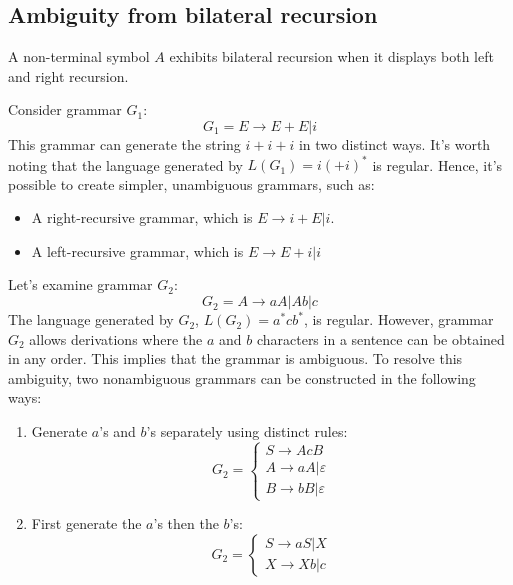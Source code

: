 \subsection*{Ambiguity from bilateral recursion}
A non-terminal symbol $A$ exhibits bilateral recursion when it displays both left and right recursion.
\begin{example}
    Consider grammar $G_1$:
    \[G_1= E \rightarrow E+E|i\]
    This grammar can generate the string $i+i+i$ in two distinct ways.
    It's worth noting that the language generated by $L(G_1)=i(+i)^{*}$ is regular.
    Hence, it's possible to create simpler, unambiguous grammars, such as:
    \begin{itemize}
        \item A right-recursive grammar, which is $E \rightarrow i+E|i$.
        \item A left-recursive grammar, which is $E \rightarrow E+i|i$
    \end{itemize}
\end{example}
\begin{example}
    Let's examine grammar $G_2$:
    \[G_2= A \rightarrow aA|Ab|c\]
    The language generated by $G_2$, $L(G_2) = a^{*}cb^{*}$, is regular. 
    However, grammar $G_2$ allows derivations where the $a$ and $b$ characters in a sentence can be obtained in any order.
    This implies that the grammar is ambiguous.
    To resolve this ambiguity, two nonambiguous grammars can be constructed in the following ways:
    \begin{enumerate}
        \item Generate $a$'s and $b$'s separately using distinct rules:
            \[G_2=
            \begin{cases}
                S \rightarrow AcB               \\
                A \rightarrow aA|\varepsilon    \\
                B \rightarrow bB|\varepsilon 
            \end{cases}    
            \]
        \item First generate the $a$'s then the $b$'s:
            \[G_2=
            \begin{cases}
                S \rightarrow aS|X              \\
                X \rightarrow Xb|c   
            \end{cases}    
            \]
    \end{enumerate} 
\end{example}

